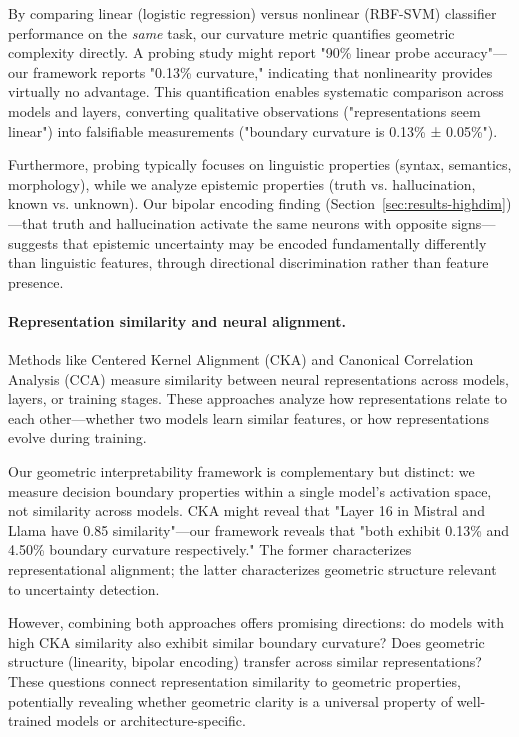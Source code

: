 \documentclass[11pt]{article}
\begin{document}
By comparing linear (logistic regression) versus nonlinear (RBF-SVM) classifier performance on the \textit{same} task, our curvature metric quantifies geometric complexity directly. A probing study might report "90\% linear probe accuracy"---our framework reports "0.13\% curvature," indicating that nonlinearity provides virtually no advantage. This quantification enables systematic comparison across models and layers, converting qualitative observations ("representations seem linear") into falsifiable measurements ("boundary curvature is 0.13\% ± 0.05\%").

Furthermore, probing typically focuses on linguistic properties (syntax, semantics, morphology), while we analyze epistemic properties (truth vs. hallucination, known vs. unknown). Our bipolar encoding finding (Section~\ref{sec:results-highdim})---that truth and hallucination activate the same neurons with opposite signs---suggests that epistemic uncertainty may be encoded fundamentally differently than linguistic features, through directional discrimination rather than feature presence.

\paragraph{Representation similarity and neural alignment.}
Methods like Centered Kernel Alignment (CKA) \citep{kornblith2019similarity} and Canonical Correlation Analysis (CCA) measure similarity between neural representations across models, layers, or training stages. These approaches analyze how representations relate to each other---whether two models learn similar features, or how representations evolve during training.

Our geometric interpretability framework is complementary but distinct: we measure decision boundary properties within a single model's activation space, not similarity across models. CKA might reveal that "Layer 16 in Mistral and Llama have 0.85 similarity"---our framework reveals that "both exhibit 0.13\% and 4.50\% boundary curvature respectively." The former characterizes representational alignment; the latter characterizes geometric structure relevant to uncertainty detection.

However, combining both approaches offers promising directions: do models with high CKA similarity also exhibit similar boundary curvature? Does geometric structure (linearity, bipolar encoding) transfer across similar representations? These questions connect representation similarity to geometric properties, potentially revealing whether geometric clarity is a universal property of well-trained models or architecture-specific.
\end{document}
